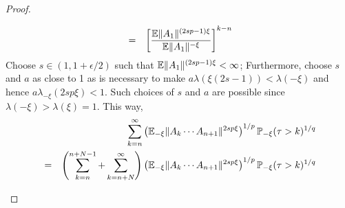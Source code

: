 \documentclass{article}
\theoremstyle{remark}
\begin{document}
\begin{proof}
\begin{enumerate}
\begin{enumerate}
\begin{eqnarray*}
        &=& \left[{\mathbb{E} \|A_1\|^{(2sp - 1)\xi}
            \over
            \mathbb{E} \|A_1\|^{-\xi}}
        \right]^{k-n}
      \end{eqnarray*}
      Choose $s \in (1, {1 + \epsilon/2})$ such that $\mathbb{E}
      \|A_1\|^{(2sp - 1)\xi} < \infty$; Furthermore, choose $s$ and $a$
      as close to 1 as is necessary to make $a \lambda(\xi(2s - 1)) <
      \lambda(-\xi)$ and hence $a \lambda_{-\xi}(2sp\xi) < 1$. Such
      choices of $s$ and $a$ are possible since $\lambda(-\xi) >
      \lambda(\xi)=1$. This way,
      \begin{eqnarray*}
        && \sum_{k=n}^\infty
        \left(\mathbb{E}_{-\xi}
          \|A_k \cdots A_{n+1}\|^{2sp\xi}
        \right)^{1/p}
        \mathbb{P}_{-\xi}(\tau > k)^{1/q} \\
        &=& \left(
          \sum_{k=n}^{n+N-1} + \sum_{k=n+N}^{\infty}
        \right) \left(\mathbb{E}_{-\xi}
          \|A_k \cdots A_{n+1}\|^{2sp\xi}
        \right)^{1/p}
        \mathbb{P}_{-\xi}(\tau > k)^{1/q}
      \end{eqnarray*}



\end{enumerate}
\end{enumerate}
\end{proof}
\end{document}
